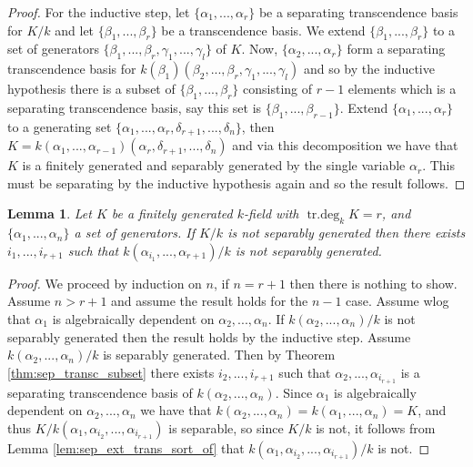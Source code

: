 \documentclass[12pt]{article}
\theoremstyle{plain}
\newtheorem{lemma}[thm]{Lemma}
\theoremstyle{definition}
\begin{document}
\begin{proof}
		For the inductive step, let $\lbrace \alpha_1,...,\alpha_r\rbrace$ be a separating transcendence basis for $K/k$ and let $\lbrace \beta_1,...,\beta_r\rbrace$ be a transcendence basis. We extend $\lbrace \beta_1,...,\beta_r\rbrace$ to a set of generators $\lbrace \beta_1,...,\beta_r,\gamma_1,...,\gamma_l\rbrace$ of $K$. Now, $\lbrace \alpha_2,...,\alpha_r\rbrace$ form a separating transcendence basis for $k(\beta_1)(\beta_2,...,\beta_r,\gamma_1,...,\gamma_l)$ and so by the inductive hypothesis there is a subset of $\lbrace \beta_1,...,\beta_r\rbrace$ consisting of $r-1$ elements which is a separating transcendence basis, say this set is $\lbrace \beta_1,...,\beta_{r-1}\rbrace$. Extend $\lbrace \alpha_1,...,\alpha_r\rbrace$ to a generating set $\lbrace \alpha_1,...,\alpha_r,\delta_{r+1},...,\delta_n\rbrace$, then $K = k(\alpha_1,...,\alpha_{r-1})(\alpha_r,\delta_{r+1},...,\delta_{n})$ and via this decomposition we have that $K$ is a finitely generated and separably generated by the single variable $\alpha_r$. This must be separating by the inductive hypothesis again and so the result follows.
	\end{proof}
	\begin{lemma}
		\label{lem:not_sep_ext} Let $K$ be a finitely generated $k$-field with $\operatorname{tr.deg}_kK = r$, and $\lbrace \alpha_1,...,\alpha_n\rbrace$ a set of generators. If $K/k$ is not separably generated then there exists $i_1,...,i_{r+1}$ such that $k(\alpha_{i_1},...,\alpha_{r+1})/k$ is not separably generated.
	\end{lemma}
	\begin{proof}
		We proceed by induction on $n$, if $n = r+1$ then there is nothing to show. Assume $n > r+1$ and assume the result holds for the $n-1$ case. Assume wlog that $\alpha_1$ is algebraically dependent on $\alpha_2,...,\alpha_n$. If $k(\alpha_2,...,\alpha_n)/k$ is not separably generated then the result holds by the inductive step. Assume $k(\alpha_2,...,\alpha_n)/k$ is separably generated. Then by Theorem \ref{thm:sep_transc_subset} there exists $i_2,...,i_{r+1}$ such that $\alpha_2,...,\alpha_{i_{r+1}}$ is a separating transcendence basis of $k(\alpha_2,...,\alpha_n)$. Since $\alpha_1$ is algebraically dependent on $\alpha_2,...,\alpha_n$ we have that $k(\alpha_2,...,\alpha_n) = k(\alpha_1,...,\alpha_n) = K$, and thus $K/k(\alpha_1,\alpha_{i_2},...,\alpha_{i_{r+1}})$ is separable, so since $K/k$ is not, it follows from Lemma \ref{lem:sep_ext_trans_sort_of} that $k(\alpha_1,\alpha_{i_2},...,\alpha_{i_{r+1}})/k$ is not.
	\end{proof}
\end{document}
